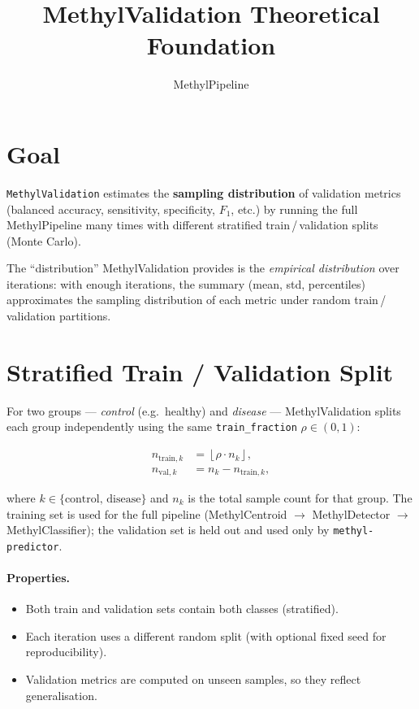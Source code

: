 \documentclass[11pt]{article}
\title{MethylValidation Theoretical Foundation}
\author{MethylPipeline}
\date{}
\begin{document}
\maketitle
\tableofcontents
\newpage

\section{Goal}

\texttt{MethylValidation} estimates the \textbf{sampling distribution} of
validation metrics (balanced accuracy, sensitivity, specificity, $F_1$, etc.)
by running the full MethylPipeline many times with different stratified
train\,/\,validation splits (Monte Carlo).

The ``distribution'' MethylValidation provides is the \emph{empirical
distribution} over iterations: with enough iterations, the summary
(mean, std, percentiles) approximates the sampling distribution of each
metric under random train\,/\,validation partitions.

\section{Stratified Train / Validation Split}

For two groups — \emph{control} (e.g.\ healthy) and \emph{disease} —
MethylValidation splits each group independently using the same
\texttt{train\_fraction} $\rho \in (0,1)$:

\begin{align}
  n_{\text{train},k} &= \left\lfloor \rho \cdot n_k \right\rfloor, \\
  n_{\text{val},k}   &= n_k - n_{\text{train},k},
\end{align}

where $k \in \{\text{control, disease}\}$ and $n_k$ is the total sample count
for that group.  The training set is used for the full pipeline
(MethylCentroid $\to$ MethylDetector $\to$ MethylClassifier); the validation
set is held out and used only by \texttt{methyl-predictor}.

\paragraph{Properties.}
\begin{itemize}
  \item Both train and validation sets contain both classes (stratified).
  \item Each iteration uses a different random split (with optional fixed seed
        for reproducibility).
  \item Validation metrics are computed on unseen samples, so they reflect
        generalisation.
\end{itemize}
\end{document}
